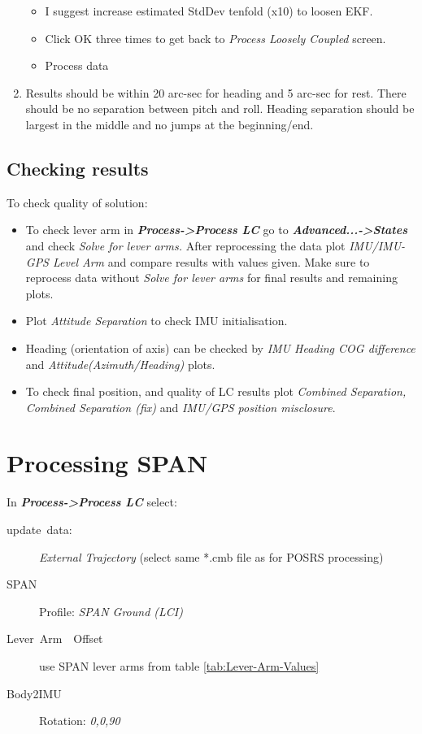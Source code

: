 \documentclass[11pt,fleqn]{book} %
\begin{document}
\begin{enumerate}
\begin{itemize}
		\item I suggest increase estimated StdDev tenfold (x10) to loosen EKF. 
		\item Click OK three times to get back to \emph{Process Loosely Coupled} screen.
		\item Process data
	\end{itemize}
	\item Results should be within 20 arc-sec for heading and 5 arc-sec for rest. There should be no separation between pitch and roll. Heading separation should be largest in the middle and no jumps at the beginning/end. 
\end{enumerate}

\subsection{Checking results}

To check quality of solution:

\begin{itemize}
	\item To check lever arm in \textbf{\emph{Process->Process LC}} go to \textbf{\emph{Advanced...->States }}and check\emph{ Solve for lever arms. }After reprocessing the data plot\emph{ IMU/IMU-GPS Level Arm} and compare results with values given. Make sure to reprocess data without \emph{Solve for lever arms }for final results and remaining plots.
	\item Plot \emph{Attitude Separation} to check IMU initialisation.
	\item Heading (orientation of axis) can be checked by \emph{IMU Heading COG difference} and \emph{Attitude(Azimuth/Heading)} plots.
	\item To check final position, and quality of LC results plot \emph{Combined Separation, Combined Separation (fix)} and\emph{ IMU/GPS position misclosure}. 
\end{itemize}

\section{Processing SPAN}\label{sub:Processing-SPAN}

In \textbf{\emph{Process->Process LC}} select:
\begin{description}
	\item [{update~data:}] \emph{External Trajectory }(select same {*}.cmb
	file as for POSRS processing)
	\item [{SPAN}] Profile: \emph{SPAN Ground (LCI) }
	\item [{Lever~Arm~~Offset}] use SPAN lever arms from table \ref{tab:Lever-Arm-Values}
	\item [{Body2IMU}] Rotation: \emph{0,0,90}
\end{description}
\end{document}
